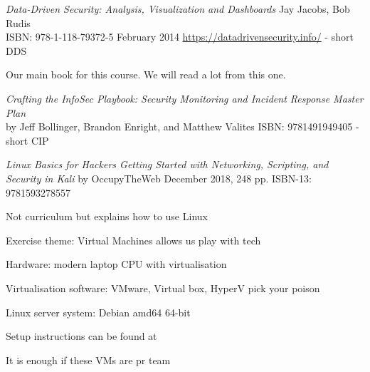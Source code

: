 \documentclass[Screen16to9,17pt]{foils}
\begin{document}

\emph{Data-Driven Security: Analysis, Visualization and Dashboards} Jay Jacobs, Bob Rudis\\
ISBN: 978-1-118-79372-5 February 2014 \url{https://datadrivensecurity.info/} - short DDS

Our main book for this course. We will read a lot from this one.



\emph{Crafting the InfoSec Playbook: Security Monitoring and Incident Response Master Plan}\\
 by Jeff Bollinger, Brandon Enright, and Matthew Valites ISBN: 9781491949405 - short CIP




\emph{Linux Basics for Hackers
Getting Started with Networking, Scripting, and Security in Kali}
by OccupyTheWeb
December 2018, 248 pp.
ISBN-13:
9781593278557

Not curriculum but explains how to use Linux



Exercise theme: Virtual Machines allows us play with tech


\begin{list2}
\item Hardware: modern laptop CPU with virtualisation
\item Virtualisation software: VMware, Virtual box, HyperV pick your poison
\item Linux server system: Debian amd64 64-bit 
\item Setup instructions can be found at 
\end{list2}

\centerline{It is enough if these VMs are pr team}



\end{document}
